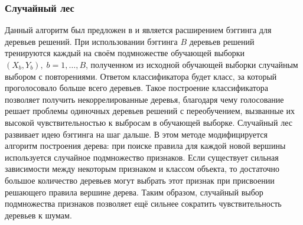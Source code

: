 
\subsubsection{Случайный лес}
Данный алгоритм был предложен в \cite{ho} и является расширением бэггинга для деревьев решений. При использовании бэггинга \(B\) деревьев решений тренируются каждый на своём подмножестве обучающей выборки \(\left(X_b, Y_b\right),\;b=1,\dotsc,B\), полученном из исходной обучающей выборки случайным выбором с повторениями. Ответом классификатора будет класс, за который проголосовало больше всего деревьев. Такое построение классификатора позволяет получить некоррелированные деревья, благодаря чему голосование решает проблемы одиночных деревьев решений с переобучением, вызванные их высокой чувствительностью к выбросам в обучающей выборке. Случайный лес развивает идею бэггинга на шаг дальше. В этом методе модифицируется алгоритм построения дерева: при поиске правила для каждой новой вершины используется случайное подмножество признаков. Если существует сильная зависимости между некоторым признаком и классом объекта, то достаточно большое количество деревьев могут выбрать этот признак при присвоении решающего правила вершине дерева. Таким образом, случайный выбор подмножества признаков позволяет ещё сильнее сократить чувствительность деревьев к шумам.


